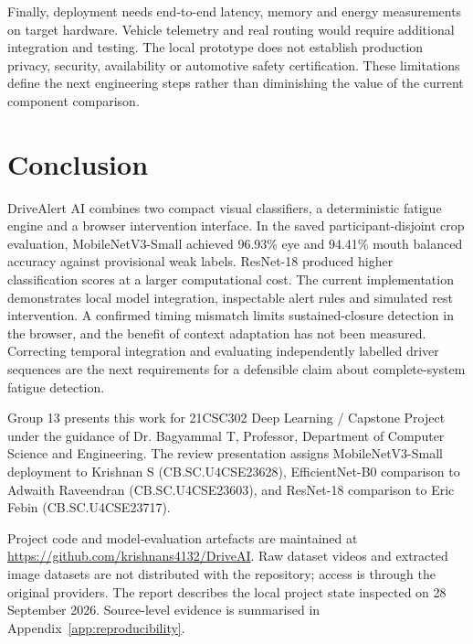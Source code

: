 \documentclass[pdflatex,sn-mathphys-num]{sn-jnl}
\begin{document}
Finally, deployment needs end-to-end latency, memory and energy measurements on target hardware. Vehicle telemetry and real routing would require additional integration and testing. The local prototype does not establish production privacy, security, availability or automotive safety certification. These limitations define the next engineering steps rather than diminishing the value of the current component comparison.

\section{Conclusion}
DriveAlert AI combines two compact visual classifiers, a deterministic fatigue engine and a browser intervention interface. In the saved participant-disjoint crop evaluation, MobileNetV3-Small achieved 96.93\% eye and 94.41\% mouth balanced accuracy against provisional weak labels. ResNet-18 produced higher classification scores at a larger computational cost. The current implementation demonstrates local model integration, inspectable alert rules and simulated rest intervention. A confirmed timing mismatch limits sustained-closure detection in the browser, and the benefit of context adaptation has not been measured. Correcting temporal integration and evaluating independently labelled driver sequences are the next requirements for a defensible claim about complete-system fatigue detection.

\backmatter
{}
Group 13 presents this work for 21CSC302 Deep Learning / Capstone Project under the guidance of Dr. Bagyammal T, Professor, Department of Computer Science and Engineering. The review presentation assigns MobileNetV3-Small deployment to Krishnan S (CB.SC.U4CSE23628), EfficientNet-B0 comparison to Adwaith Raveendran (CB.SC.U4CSE23603), and ResNet-18 comparison to Eric Febin (CB.SC.U4CSE23717).

Project code and model-evaluation artefacts are maintained at \url{https://github.com/krishnans4132/DriveAI}. Raw dataset videos and extracted image datasets are not distributed with the repository; access is through the original providers. The report describes the local project state inspected on 28 September 2026. Source-level evidence is summarised in Appendix~\ref{app:reproducibility}.
\end{document}
